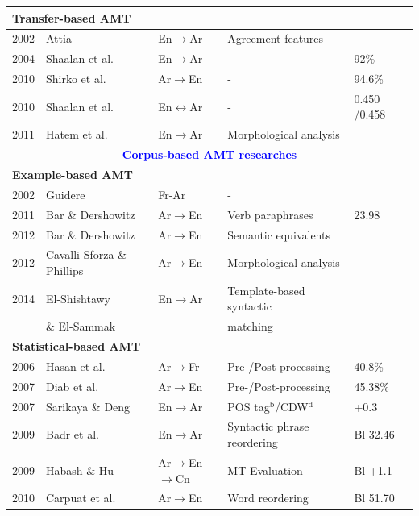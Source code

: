 \begin{small}
\begin{longtable}{|l|l|l|l|l|}
		\multicolumn{5}{l}{\textbf{Transfer-based AMT}}\\
		\hline
		2002 & Attia \cite{attia02}							& En$\rightarrow$Ar &Agreement features&\\
		2004 & Shaalan et al. \cite{shaalan04}				& En$\rightarrow$Ar &-& 92\%\\
		2010 & Shirko et al. \cite{shirko10}				& Ar$\rightarrow$En &-& 94.6\%\\
		2010 & Shaalan et al. \cite{shaalan10a}				& En$\leftrightarrow$Ar &-& 0.450%
		/0.458%
		\\
		2011 & Hatem et al. \cite{hatem11}					& En$\rightarrow$Ar &Morphological analysis&\\
		\hline
		\multicolumn{5}{c}{\textbf{\textcolor{blue}{Corpus-based AMT researches}}}\\
		\multicolumn{5}{l}{\textbf{Example-based AMT}}\\
		\hline
		2002 & Guidere \cite{guidere02}					& Fr-Ar &-&\\
		2011 & Bar \& Dershowitz \cite{Bar11}			& Ar$\rightarrow$En &Verb paraphrases& 23.98\\
		2012 & Bar \& Dershowitz \cite{Bar12}			& Ar$\rightarrow$En &Semantic equivalents&\\
		2012 & Cavalli-Sforza \& Phillips \cite{Cavalli-Sforza12}	& Ar$\rightarrow$En &Morphological analysis&\\
		2014 & El-Shishtawy 		& En$\rightarrow$Ar &Template-based syntactic &\\
		&\& El-Sammak \cite{elshishtawy14}		& & matching&\\
		\hline
		\multicolumn{5}{l}{\textbf{Statistical-based AMT}}\\
		\hline
		2006 & Hasan et al. \cite{hasan06}				& Ar$\rightarrow$Fr &Pre-/Post-processing& 40.8\%\\
		2007 & Diab et al. \cite{diab07}				& Ar$\rightarrow$En &Pre-/Post-processing& 45.38\%\\
		2007 & Sarikaya \& Deng \cite{sarikaya07}		& En$\rightarrow$Ar &POS tag$^{\mathrm{b}}$/CDW$^{\mathrm{d}}$&+0.3\\
		2009 & Badr et al. \cite{badr09}				& En$\rightarrow$Ar &Syntactic phrase reordering&Bl 32.46\\
		2009 & Habash \& Hu \cite{habash-hu09}		& Ar$\rightarrow$En$\rightarrow$Cn &MT Evaluation&Bl +1.1\\
		2010 & Carpuat et al. \cite{carpuat10}			& Ar$\rightarrow$En &Word reordering&Bl 51.70\\

\end{longtable}
\end{small}
